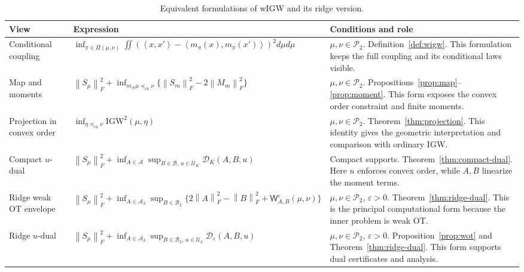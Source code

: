 \documentclass[11pt]{article}
\newcommand{\cP}{\mathcal P}
\newcommand{\cU}{\mathcal U}
\newcommand{\ip}[2]{\left\langle #1,#2\right\rangle}
\newcommand{\norm}[1]{\left\lVert #1\right\rVert}
\newcommand{\cx}{\preceq_{\mathrm{cx}}}
\newcommand{\IGW}{\mathrm{IGW}}
\theoremstyle{plain}
\theoremstyle{definition}
\theoremstyle{remark}
\begin{document}
\begin{table}[H]
\centering
\footnotesize
\setlength{\tabcolsep}{4pt}
\renewcommand{\arraystretch}{1.05}
\captionsetup{skip=4pt}
\begin{tabularx}{\textwidth}{@{}>{\raggedright\arraybackslash}p{}X
  >{\raggedright\arraybackslash}p{}@{}}
\toprule
View & Expression & Conditions and role\\
\midrule
Conditional coupling &
$\displaystyle \inf_{\pi\in\Pi(\mu,\nu)}
 \iint(\ip{x}{x'}-\ip{m_\pi(x)}{m_\pi(x')})^2d\mu d\mu$ &
$\mu,\nu\in\cP_2$. Definition~\ref{def:wigw}. This formulation keeps the full
coupling and its conditional laws visible.\\

Map and moments &
$\displaystyle \norm{S_\mu}_F^2+
 \inf_{m_\#\mu\cx\nu}\{\norm{S_m}_F^2-2\norm{M_m}_F^2\}$ &
$\mu,\nu\in\cP_2$. Propositions~\ref{prop:map}--\ref{prop:moment}. This form
exposes the convex order constraint and finite moments.\\

Projection in convex order &
$\displaystyle \inf_{\eta\cx\nu}\IGW^2(\mu,\eta)$ &
$\mu,\nu\in\cP_2$. Theorem~\ref{thm:projection}. This identity gives the geometric
interpretation and comparison with ordinary IGW.\\

Compact $u$-dual &
$\displaystyle \norm{S_\mu}_F^2+
 \inf_{A\in\mathcal A}\sup_{B\in\mathcal B,\,u\in\cU_K}
 \mathcal D_K(A,B,u)$ &
Compact supports. Theorem~\ref{thm:compact-dual}. Here $u$ enforces convex order,
while $A,B$ linearize the moment terms.\\
\midrule
Ridge weak OT envelope &
$\displaystyle \norm{S_\mu}_F^2+
 \inf_{A\in\mathcal A_2}\sup_{B\in\mathcal B_2}
 \{2\norm A_F^2-\norm B_F^2+\mathsf W_{A,B}^{\varepsilon}(\mu,\nu)\}$ &
$\mu,\nu\in\cP_2$, $\varepsilon>0$. Theorem~\ref{thm:ridge-dual}. This is the
principal computational form because the inner problem is weak OT.\\

Ridge $u$-dual &
$\displaystyle \norm{S_\mu}_F^2+
 \inf_{A\in\mathcal A_2}\sup_{B\in\mathcal B_2,\,u\in\cU_2}
 \mathcal D_\varepsilon(A,B,u)$ &
$\mu,\nu\in\cP_2$, $\varepsilon>0$. Proposition~\ref{prop:wot} and
Theorem~\ref{thm:ridge-dual}. This form supports dual certificates and analysis.\\
\bottomrule
\end{tabularx}
\caption{Equivalent formulations of wIGW and its ridge version.}
\label{tab:equivalent-forms}
\end{table}
\end{document}
